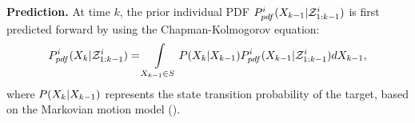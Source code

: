 	\textbf{Prediction.}
	At time $k$, the prior individual PDF $P^i_{pdf}(X_{k-1}|\mathcal{Z}^i_{1:k-1})$ is first predicted forward by using the Chapman-Kolmogorov equation:
	\small
	\begin{equation}\label{eqn:bayes_pred}
	P^i_{pdf}(X_k|\mathcal{Z}^i_{1:k-1})
	=\int\limits_{X_{k-1}\in S} P(X_k|X_{k-1})P^i_{pdf}(X_{k-1}|\mathcal{Z}^i_{1:k-1})dX_{k-1},
	\end{equation}\normalsize
	where $P(X_k|X_{k-1})$ represents the state transition probability of the target, based on the Markovian motion model (). %
	
